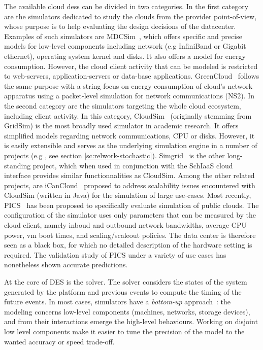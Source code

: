 \documentclass[10pt,conference,compsocconf]{IEEEtran}
\begin{document}
The available  cloud \acp{des} can  be divided in  two categories. In  the first
category are  the simulators  dedicated to  study the  clouds from  the provider
point-of-view, whose purpose  is to help evaluating the design  decisions of the
datacenter. Examples  of such simulators are  MDCSim~\cite{MDCSim}, which offers
specific  and precise  models for  low-level components  including network  (e.g
InfiniBand or  Gigabit ethernet),  operating system kernel  and disks.   It also
offers a model  for energy consumption. However, the cloud  client activity that
can be  modeled is restricted  to web-servers, application-servers  or data-base
applications.   GreenCloud~\cite{greencloud} follows  the  same  purpose with  a
string  focus  on  energy  consumption  of cloud's  network  apparatus  using  a
packet-level  simulation  for  network  communications  (NS2).   In  the  second
category  are the  simulators  targeting the  whole  cloud ecosystem,  including
client activity. In this category, CloudSim~\cite{cloudsim} (originally stemming
from  GridSim) is  the most  broadly used  simulator in  academic research.   It
offers simplified models regarding network communications, CPU or disks. However,
it is  easily extensible  and serves  as the underlying  simulation engine  in a
number of projects (e.g  \cite{Cai17}, see section \ref{sc:relwork-stochastic}).
Simgrid~\cite{simgrid} is  the other long-standing  project, which when  used in
conjunction with  the SchIaaS cloud interface  provides similar functionnalities
as CloudSim.   Among the other related  projects, are iCanCloud~\cite{iCanCloud}
proposed to  address scalability  issues encountered  with CloudSim  (written in
Java) for the simulation of large use-cases. Most recently, PICS~\cite{pics} has
been  proposed  to  specifically  evaluate simulation  of  public  clouds.   The
configuration of the simulator uses only  parameters that can be measured by the
cloud client, namely inboud and  outbound network bandwidths, average CPU power,
\ac{vm} boot times, and scaling/scaleout  policies. The data center is therefore
seen as a black  box, for which no detailed description  of the hardware setting
is required.  The validation  study of  PICS under  a variety  of use  cases has
nonetheless shown accurate predictions.

At the core of DES is the solver.  The solver considers the states of the system
generated  by the  platform and  previous events  to compute  the timing  of the
future events. %
In  most  cases, simulators  have  a  \emph{bottom-up} approach~:  the  modeling
concerns low-level  components (machines,  networks, storage devices),  and from
their interactions  emerge the high-level  behaviours. Working on  disjoint low
level components make it easier to tune the precision of the model to the wanted
accuracy or speed trade-off.
\end{document}
